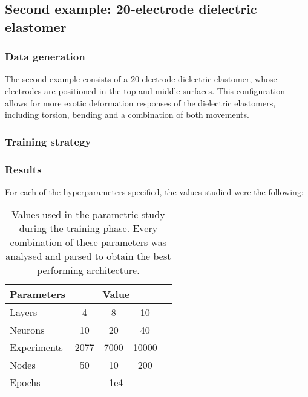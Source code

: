 \subsection{Second example: 20-electrode dielectric elastomer}

\subsubsection{Data generation}

The second example consists of a 20-electrode dielectric elastomer, whose electrodes are positioned in the top and middle surfaces. This configuration allows for more exotic deformation responses of the dielectric elastomers, including torsion, bending and a combination of both movements.


\subsubsection{Training strategy}
\subsubsection{Results}

For each of the hyperparameters specified, the values studied were the following:

\begin{table}[!hb]
  \centering
\begin{tabular}{l|cccc}
\textbf{Parameters} & \multicolumn{3}{c}{\textbf{Value}} \\ \hline
Layers              & 4      & 8       & 10            \\
Neurons             & 10     & 20      & 40           \\
Experiments         & 2077    & 7000    & 10000      \\
Nodes               & 50     & 10      & 200           \\
Epochs              &  \multicolumn{3}{c}{1e4}        
\end{tabular}
  \caption{Values used in the parametric study during the training phase. Every combination of these parameters was analysed and parsed to obtain the best performing architecture.}
\end{table}







